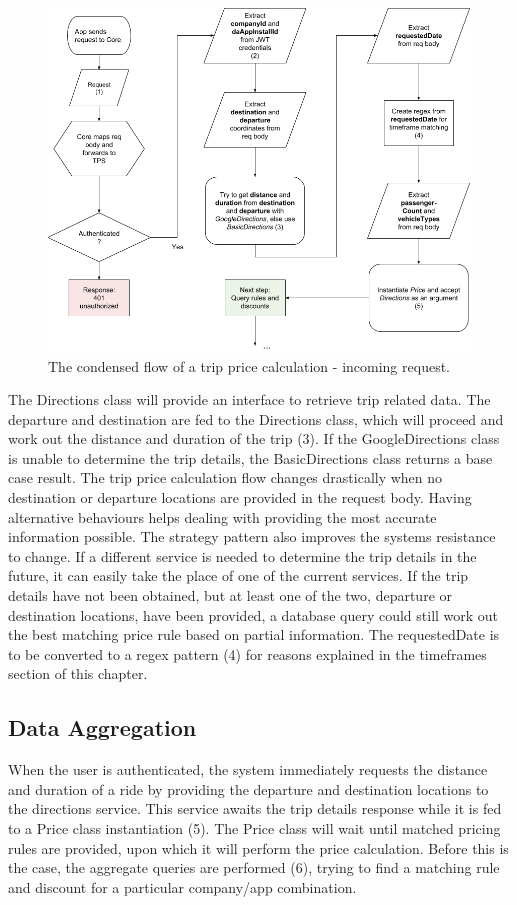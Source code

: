 \begin{figure}[H]
	\centering
	\includegraphics[width=1\textwidth]{IncomingRequest}
	\caption[Incoming Request]{The condensed flow of a trip price calculation - incoming request.}
	\label{fig:Incoming Request}
\end{figure}

The Directions class will provide an interface to retrieve trip related data. The departure and destination are fed to the Directions class, which will proceed and work out the distance and duration of the trip (3). If the GoogleDirections class is unable to determine the trip details, the BasicDirections class returns a base case result. The trip price calculation flow changes drastically when no destination or departure locations are provided in the request body. Having alternative behaviours helps dealing with providing the most accurate information possible. The strategy pattern also improves the systems resistance to change. If a different service is needed to determine the trip details in the future, it can easily take the place of one of the current services. If the trip details have not been obtained, but at least one of the two, departure or destination locations, have been provided, a database query could still work out the best matching price rule based on partial information. The requestedDate is to be converted to a regex pattern (4) for reasons explained in the timeframes section of this chapter.

\subsection{Data Aggregation}
When the user is authenticated, the system immediately requests the distance and duration of a ride by providing the departure and destination locations to the directions service. This service awaits the trip details response while it is fed to a Price class instantiation (5). The Price class will wait until matched pricing rules are provided, upon which it will perform the price calculation. Before this is the case, the aggregate queries are performed (6), trying to find a matching rule and discount for a particular company/app combination.

